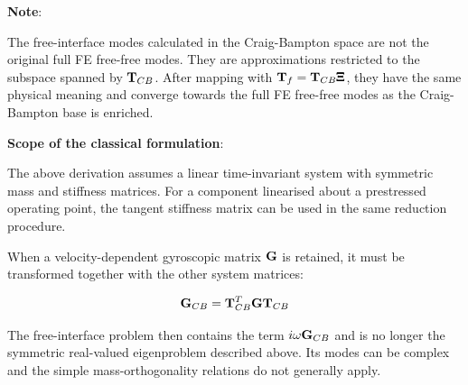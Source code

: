 \begin{bbox}[0.96]
    \textbf{Note}:

    The free-interface modes calculated in the Craig-Bampton space are not the
    original full FE free-free modes. They are approximations restricted to the
    subspace spanned by $ \mathbf{T}_{CB} $. After mapping with
    $ \mathbf{T}_f = \mathbf{T}_{CB}\pmb{\Xi} $, they have the same physical meaning and
    converge towards the full FE free-free modes as the Craig-Bampton base is
    enriched.
\end{bbox}


\begin{bbox}[0.96]
    \textbf{Scope of the classical formulation}:

    The above derivation assumes a linear time-invariant system with symmetric
    mass and stiffness matrices. For a component linearised about a prestressed
    operating point, the tangent stiffness matrix can be used in the same
    reduction procedure.

    When a velocity-dependent gyroscopic matrix $ \mathbf{G} $ is retained, it must be
    transformed together with the other system matrices:

    \begin{equation}
        \mathbf{G}_{CB} = \mathbf{T}_{CB}^T\mathbf{G}\mathbf{T}_{CB}
    \end{equation}

    The free-interface problem then contains the term $ i\omega\mathbf{G}_{CB} $ and is
    no longer the symmetric real-valued eigenproblem described above. Its modes
    can be complex and the simple mass-orthogonality relations do not generally
    apply.
\end{bbox}
